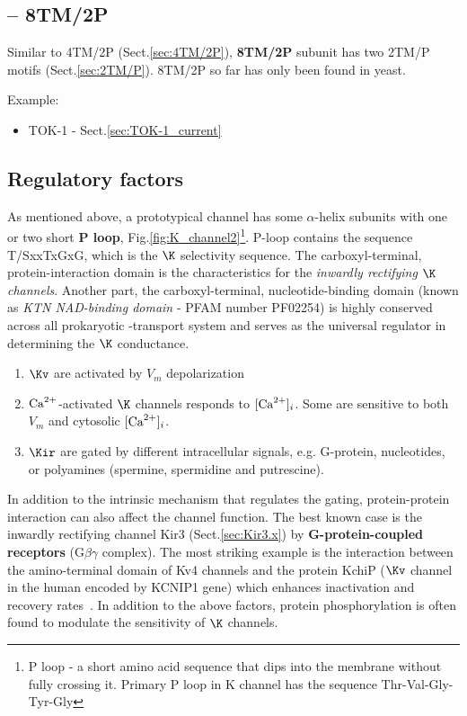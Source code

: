 \subsection{-- 8TM/2P}
\label{sec:8TM/2P}

Similar to 4TM/2P (Sect.\ref{sec:4TM/2P}), {\bf 8TM/2P} subunit has two 2TM/P
motifs (Sect.\ref{sec:2TM/P}). 8TM/2P so far has only been found in yeast.

Example:
\begin{itemize}
  \item TOK-1 - Sect.\ref{sec:TOK-1_current}
\end{itemize}


\subsection{Regulatory factors}
\label{sec:K_regulatory-factors}

As mentioned above, a prototypical  channel has some $\alpha$-helix
subunits with one or two short {\bf P loop}, Fig.\ref{fig:K_channel2}\footnote{P
loop - a short amino acid sequence that dips into the membrane without fully
crossing it.
Primary P loop in K channel has the sequence Thr-Val-Gly-Tyr-Gly}. P-loop
contains the sequence T/SxxTxGxG, which is the $\K$ selectivity sequence.
The carboxyl-terminal, protein-interaction domain is the characteristics for the
{\it inwardly rectifying $\K$ channels}. Another part, the carboxyl-terminal,
nucleotide-binding domain (known as {\it KTN NAD-binding domain} - PFAM number
PF02254) is highly conserved across all prokaryotic -transport system and
serves as the universal regulator in determining the $\K$ conductance.

\begin{enumerate}
\item $\Kv$ are activated by $V_m$ depolarization

\item ${\text{Ca}^{2+}}$-activated $\K$ channels responds to $[{\text{Ca}^{2+}}]_i$. Some are sensitive to
both $V_m$ and cytosolic $[{\text{Ca}^{2+}}]_i$.

\item $\Kir$ are gated by different intracellular signals,
  e.g. G-protein, nucleotides, or polyamines (spermine, spermidine and
  putrescine).
\end{enumerate}

In addition to the intrinsic mechanism that regulates the gating,
protein-protein interaction can also affect the channel function. The best known
case is the inwardly rectifying  channel Kir3 (Sect.\ref{sec:Kir3.x}) by
{\bf G-protein-coupled receptors} (G$\beta\gamma$ complex).
The most striking example is the interaction between the amino-terminal domain
of Kv4 channels and the protein KchiP ($\Kv$ channel in the human encoded by
KCNIP1 gene) which enhances inactivation and recovery rates~\citep{choe2002pcs}.
In addition to the above factors, protein phosphorylation is often found to
modulate the sensitivity of $\K$ channels.

